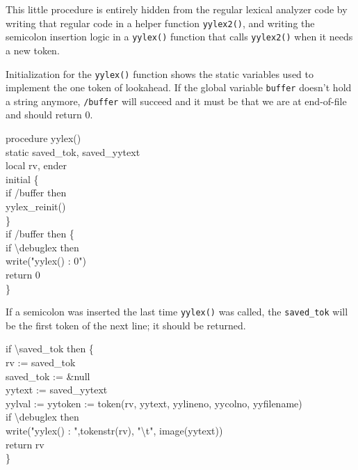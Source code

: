 This little procedure is entirely hidden from the regular lexical
analyzer code by writing that regular code in a helper function
\texttt{yylex2()}, and writing the semicolon insertion logic in a
\texttt{yylex()} function that calls \texttt{yylex2()} when it needs a
new token.

Initialization for the \texttt{yylex()} function shows the static
variables used to implement the one token of lookahead. If the global
variable \texttt{buffer} doesn't hold a string anymore,
\texttt{/buffer} will succeed and it must be that we are at
end-of-file and should return 0.

\begin{iconcode}
procedure yylex() \\
static saved\_tok, saved\_yytext \\
local rv, ender \\
initial \{ \\
\>   if /buffer then \\
\> \>    yylex\_reinit() \\
\> \>    \} \\
\>   if /buffer then \{ \\
\> \>     if {\textbackslash}debuglex then \\
\> \> \>       write("yylex() : 0") \\
\> \>     return 0 \\
\> \>     \}
\end{iconcode}


If a semicolon was inserted the last time \texttt{yylex()} was called,
the \texttt{saved\_tok} will be the first token of the next line; it
should be returned.

\begin{iconcode}
\>   if {\textbackslash}saved\_tok then \{ \\
\> \>   rv := saved\_tok \\
\> \>   saved\_tok := \&null \\
\> \>   yytext := saved\_yytext \\
\> \>   yylval := yytoken := token(rv, yytext, yylineno, yycolno, yyfilename) \\
\> \>   if {\textbackslash}debuglex then \\
\> \> \>    write("yylex() : ",tokenstr(rv),
                  "{\textbackslash}t", image(yytext)) \\
\> \>   return rv \\
\> \> \}
\end{iconcode}

